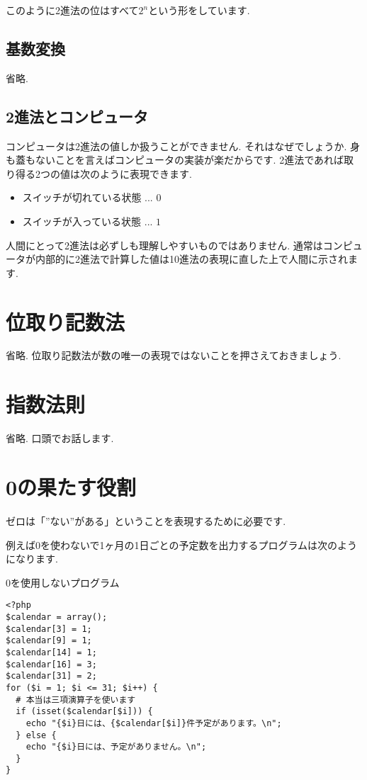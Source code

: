 \documentclass[10pt, twocolumn]{jarticle}
\begin{document}
このように2進法の位はすべて$2^n$という形をしています.

\subsection{基数変換}

省略.

\subsection{2進法とコンピュータ}

コンピュータは2進法の値しか扱うことができません.
それはなぜでしょうか.
身も蓋もないことを言えばコンピュータの実装が楽だからです.
2進法であれば取り得る2つの値は次のように表現できます.

\begin{itemize}
  \item スイッチが切れている状態 ... $0$
  \item スイッチが入っている状態 ... $1$
\end{itemize}

人間にとって2進法は必ずしも理解しやすいものではありません.
通常はコンピュータが内部的に2進法で計算した値は10進法の表現に直した上で人間に示されます.

\section{位取り記数法}

省略.
位取り記数法が数の唯一の表現ではないことを押さえておきましょう.

\section{指数法則}

省略.
口頭でお話します.

\section{0の果たす役割}

ゼロは「''ない''がある」ということを表現するために必要です.

例えば0を使わないで1ヶ月の1日ごとの予定数を出力するプログラムは次のようになります.

\begin{itembox}[l]{0を使用しないプログラム}
\begin{verbatim}
<?php
$calendar = array();
$calendar[3] = 1;
$calendar[9] = 1;
$calendar[14] = 1;
$calendar[16] = 3;
$calendar[31] = 2;
for ($i = 1; $i <= 31; $i++) {
  # 本当は三項演算子を使います
  if (isset($calendar[$i])) {
    echo "{$i}日には、{$calendar[$i]}件予定があります。\n";
  } else {
    echo "{$i}日には、予定がありません。\n";
  }
}
\end{verbatim}
\end{itembox}
\end{document}
